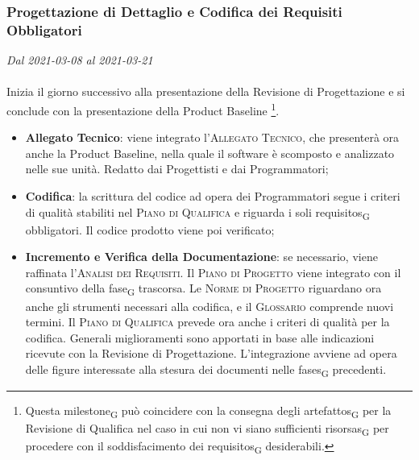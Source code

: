\subsubsection{Progettazione di Dettaglio e Codifica dei Requisiti Obbligatori}

\textit{Dal 2021-03-08 al 2021-03-21}
\\\\
Inizia il giorno successivo alla presentazione della Revisione di Progettazione e si conclude con la presentazione della Product Baseline \footnote{Questa \gls{milestone}\textsubscript{G} può coincidere con la consegna degli \glspl{artefatto}\textsubscript{G} per la Revisione di Qualifica nel caso in cui non vi siano sufficienti \glspl{risorsa}\textsubscript{G} per procedere con il soddisfacimento dei \glspl{requisito}\textsubscript{G} desiderabili.}.
\begin{itemize}
	\item \textbf{Allegato Tecnico}: viene integrato l'\textsc{Allegato Tecnico}, che presenterà ora anche la Product Baseline, nella quale il software è scomposto e analizzato nelle sue unità. Redatto dai Progettisti e dai Programmatori;
	\item \textbf{Codifica}: la scrittura del codice ad opera dei Programmatori segue i criteri di qualità stabiliti nel \textsc{Piano di Qualifica} e riguarda i soli \glspl{requisito}\textsubscript{G} obbligatori. Il codice prodotto viene poi verificato;
	\item \textbf{Incremento e Verifica della Documentazione}: se necessario, viene raffinata l'\textsc{Analisi dei Requisiti}. Il \textsc{Piano di Progetto} viene integrato con il consuntivo della \gls{fase}\textsubscript{G} trascorsa.  Le \textsc{Norme di Progetto} riguardano ora anche gli strumenti necessari alla codifica, e il \textsc{Glossario} comprende nuovi termini. Il \textsc{Piano di Qualifica} prevede ora anche i criteri di qualità per la codifica. Generali miglioramenti sono apportati in base alle indicazioni ricevute con la Revisione di Progettazione. L'integrazione avviene ad opera delle figure interessate alla stesura dei documenti nelle \glspl{fase}\textsubscript{G} precedenti.
	
\end{itemize}


